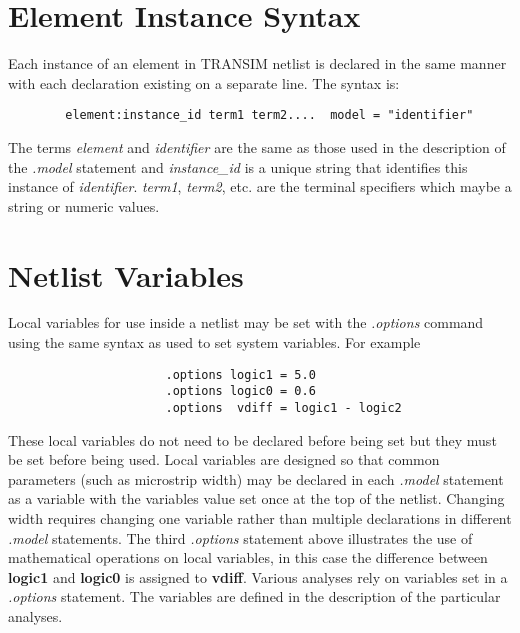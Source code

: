 \section{Element Instance Syntax}

Each instance of an element in TRANSIM netlist is declared in the
same manner with each declaration existing on a separate line.
The syntax is:
\begin{tt}
\begin{verbatim}
        element:instance_id term1 term2....  model = "identifier"
\end{verbatim}
\end{tt}
The terms {\em element} and {\em identifier} are the same as those
used in the description of the {\em .model} statement and {\em
instance\_id} is a unique string that identifies this instance of
{\em identifier}. {\em term1}, {\em term2}, etc. are the terminal
specifiers which maybe a string or numeric values.

\section{Netlist Variables}

Local variables for use inside a netlist may be set with the {\em
.options} command using the same syntax as used to set system
variables.  For example

\begin{tt}
\begin{verbatim}
                      .options logic1 = 5.0
                      .options logic0 = 0.6
                      .options  vdiff = logic1 - logic2
\end{verbatim}
\end{tt}

These local variables do not need to be declared before being set
but they must be set before being used.  Local variables are
designed so that common parameters (such as microstrip width) may
be declared in each {\em .model} statement as a variable with the
variables value set once at the top of the netlist.  Changing
width requires changing one variable rather than multiple
declarations in different {\em .model} statements. The third {\em
.options} statement above illustrates the use of mathematical
operations on local variables, in this case the difference between
{\bf logic1} and {\bf logic0} is assigned to {\bf vdiff}. Various
analyses rely on variables set in a {\em .options} statement.  The
variables are defined in the description of the particular
analyses.

